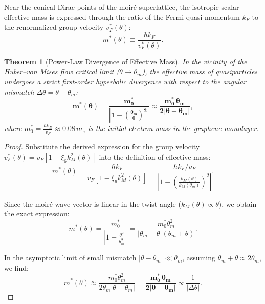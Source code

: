\documentclass[12pt,a4paper]{article}
\newtheorem{theorem}{Theorem}
\begin{document}
		Near the conical Dirac points of the moiré superlattice, the isotropic scalar effective mass is expressed through the ratio of the Fermi quasi-momentum $k_F$ to the renormalized group velocity $v_F^*(\theta)$:
		\begin{equation}
			m^*(\theta) \equiv \frac{\hbar k_F}{v_F^*(\theta)}.
		\end{equation}
		
		\begin{theorem}[Power-Law Divergence of Effective Mass]
			In the vicinity of the Huber--von Mises flow critical limit ($\theta \to \theta_m$), the effective mass of quasiparticles undergoes a strict first-order hyperbolic divergence with respect to the angular mismatch $\Delta \theta = \theta - \theta_m$:
			\begin{equation}
				\mathbf{m^*(\theta) = \frac{m_0^*}{\left| 1 - \left(\frac{\theta_m}{\theta}\right)^2 \right|} \approx \frac{m_0^* \, \theta_m}{2 |\theta - \theta_m|}},
			\end{equation}
			where $m_0^* = \frac{\hbar k_D}{v_F} \approx 0.08 \, m_e$ is the initial electron mass in the graphene monolayer.
		\end{theorem}
		
		\begin{proof}
			Substitute the derived expression for the group velocity $v_F^*(\theta) = v_F [1 - \xi_6 k_M^2(\theta)]$ into the definition of effective mass:
			\begin{equation}
				m^*(\theta) = \frac{\hbar k_F}{v_F \left[ 1 - \xi_6 k_M^2(\theta) \right]} = \frac{\hbar k_F / v_F}{\left| 1 - \left(\frac{k_M(\theta)}{k_M(\theta_m)}\right)^2 \right|}.
			\end{equation}
			
			Since the moiré wave vector is linear in the twist angle ($k_M(\theta) \propto \theta$), we obtain the exact expression:
			\begin{equation}
				m^*(\theta) = \frac{m_0^*}{\left| 1 - \frac{\theta^2}{\theta_m^2} \right|} = \frac{m_0^* \theta_m^2}{|\theta_m - \theta|(\theta_m + \theta)}.
			\end{equation}
			
			In the asymptotic limit of small mismatch $|\theta - \theta_m| \ll \theta_m$, assuming $\theta_m + \theta \approx 2\theta_m$, we find:
			\begin{equation}
				m^*(\theta) \approx \frac{m_0^* \theta_m^2}{2 \theta_m |\theta - \theta_m|} = \mathbf{\frac{m_0^* \, \theta_m}{2 |\theta - \theta_m|}} \propto \frac{1}{|\Delta \theta|}.
			\end{equation}
		\end{proof}
		
\end{document}
